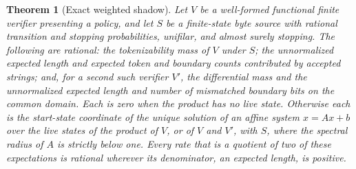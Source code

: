 \documentclass[11pt,a4paper]{article}
\theoremstyle{definition}
\theoremstyle{plain}
\newtheorem{theorem}{Theorem}
\begin{document}
\begin{theorem}[Exact weighted shadow]\label{thm:weighted} Let $V$ be a well-formed functional finite verifier
presenting a policy, and let $S$ be a finite-state byte source with rational transition and stopping probabilities,
unifilar, and almost surely stopping. The following are rational: the tokenizability mass of $V$ under $S$; the
unnormalized expected length and expected token and boundary counts contributed by accepted strings; and, for a second
such verifier $V'$, the differential mass and the unnormalized expected length and number of mismatched boundary bits on
the common domain. Each is zero when the product has no live state. Otherwise each is the start-state coordinate of the
unique solution of an affine system $x = Ax + b$ over the live states of the product of $V$, or of $V$ and $V'$, with
$S$, where the spectral radius of $A$ is strictly below one. Every rate that is a quotient of two of these expectations
is rational wherever its denominator, an expected length, is positive.
\end{theorem}
\end{document}
